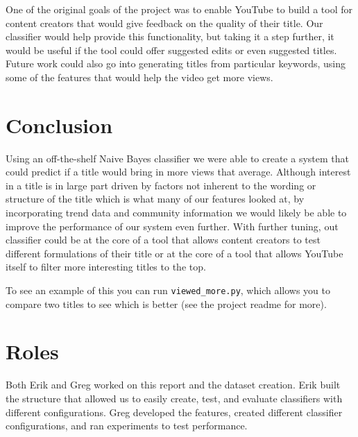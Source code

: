 \documentclass[a4paper,12pt]{article}
\begin{document}
One of the original goals of the project was to enable YouTube to build a tool for content creators that would give feedback on the quality of their title. Our classifier would help provide this functionality, but taking it a step further, it would be useful if the tool could offer suggested edits or even suggested titles. Future work could also go into generating titles from particular keywords, using some of the features that would help the video get more views.

\section{Conclusion}

Using an off-the-shelf Naive Bayes classifier we were able to create a system that could predict if a title would bring in more views that average. Although interest in a title is in large part driven by factors not inherent to the wording or structure of the title which is what many of our features looked at, by incorporating trend data and community information we would likely be able to improve the performance of our system even further. With further tuning, out classifier could be at the core of a tool that allows content creators to test different formulations of their title or at the core of a tool that allows YouTube itself to filter more interesting titles to the top.

To see an example of this you can run \texttt{viewed\_more.py}, which allows you to compare two titles to see which is better (see the project readme for more).




\appendix
\section{Roles}
Both Erik and Greg worked on this report and the dataset creation. Erik built the structure that allowed us to easily create, test, and evaluate classifiers with different configurations. Greg developed the features, created different classifier configurations, and ran experiments to test performance.
\end{document}
